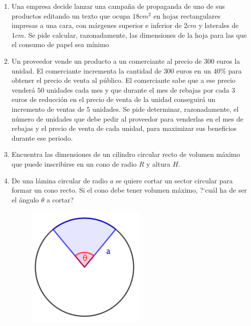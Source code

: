 \begin{enumerate}
\rightline{\textcolor{gris}{Precio mínimo: $\; 141.96 $ euros}}

\item Una empresa decide lanzar una campaña de propaganda de uno de sus productos editando un texto que ocupa $18 cm^2$ en hojas rectangulares impresas a una cara, con márgenes superior e inferior de $2 cm$ y laterales de $1 cm$. Se pide calcular, razonadamente, las dimensiones de la hoja para las que el consumo de papel sea mínimo 

\rightline{\textcolor{gris}{Solución: El papel es mínimo para $5 cm ; \times ; 10cm$}}

\item Un proveedor vende un producto a un comerciante al precio de $300$ euros la unidad. El comerciante incrementa la cantidad de $300$ euros en un $40\%$ para obtener el precio de venta al público. El comerciante sabe que a ese precio 
	venderá $50$ unidades cada mes y que durante el mes de rebajas por cada $3$ euros de reducción en el precio de venta de la unidad conseguirá un incremento de ventas de $5$ unidades. Se pide determinar, razonadamente, el 
número de unidades que debe pedir al proveedor para venderlas en el mes de rebajas y el precio de venta de cada unidad, para maximizar sus beneficios durante ese periodo. 

\rightline{\textcolor{gris}{Solución: Debe pedir $125\; u$ y vender cada unidad a $375$ euros.}}

\item Encuentra las dimensiones de un cilindro circular recto de volumen máximo que puede inscribirse en un cono de radio $R$ y altura $H$.


\clearpage

\item 

	\begin{multicols}{2}
	De una lámina circular de radio $a$ se quiere cortar un sector circular para formar un cono recto. Si el cono debe tener volumen máximo, ?`cuál ha de ser el ángulo $\theta$ a cortar?
	\begin{figure}[H]
		\centering
		\includegraphics[width=.2\textwidth]{imagenes/imagenes05/T05IM55.png}
	\end{figure}
		

\end{multicols}
\end{enumerate}

